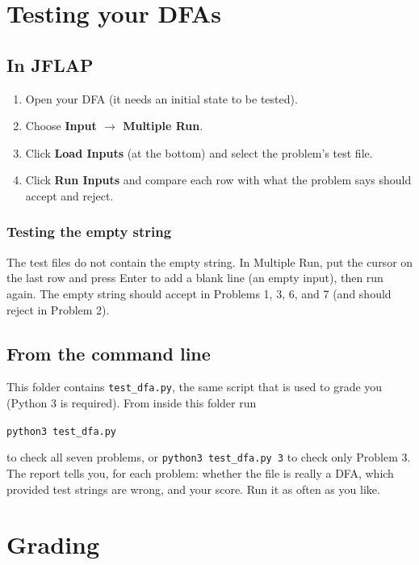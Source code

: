 \documentclass[11pt]{article}
\begin{document}
\section*{Testing your DFAs}

\subsection*{In JFLAP}
\begin{enumerate}
  \item Open your DFA (it needs an initial state to be tested).
  \item Choose \textbf{Input $\to$ Multiple Run}.
  \item Click \textbf{Load Inputs} (at the bottom) and select the problem's test file.
  \item Click \textbf{Run Inputs} and compare each row with what the problem says should
        accept and reject.
\end{enumerate}

\subsubsection*{Testing the empty string}
The test files do not contain the empty string. In Multiple Run, put the cursor on the last
row and press Enter to add a blank line (an empty input), then run again. The empty string
should accept in Problems 1, 3, 6, and 7 (and should reject in Problem 2).

\subsection*{From the command line}
This folder contains \texttt{test\_dfa.py}, the same script that is used to grade you (Python 3
is required). From inside this folder run
\begin{center}
\texttt{python3 test\_dfa.py}
\end{center}
to check all seven problems, or \texttt{python3 test\_dfa.py 3} to check only Problem 3. The
report tells you, for each problem: whether the file is really a DFA, which provided test
strings are wrong, and your score. Run it as often as you like.

\section*{Grading}
\end{document}
